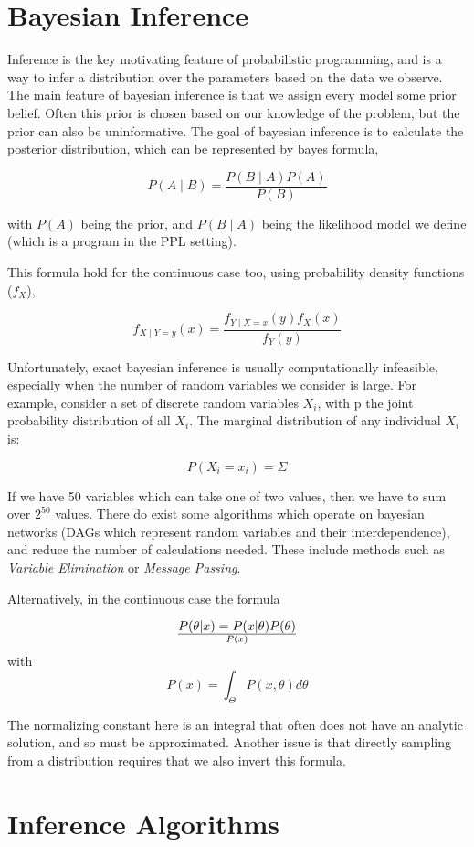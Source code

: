 \section{Bayesian Inference}
Inference is the key motivating feature of probabilistic programming, and is a way to infer a distribution over the parameters based on the data we observe. The main feature of bayesian inference is that we assign every model some prior belief. Often this prior is chosen based on our knowledge of the problem, but the prior can also be uninformative. The goal of bayesian inference is to calculate the posterior distribution, which can be represented by bayes formula,


$$P(A\mid B)={\frac {P(B\mid A)P(A)}{P(B)}}$$

with $P(A)$ being the prior, and $P(B\mid A)$ being the likelihood model we define (which is a program in the PPL setting).

This formula hold for the continuous case too, using probability density functions ($f_X$),

$$ f_{X\mid Y=y}(x)={\frac {f_{Y\mid X=x}(y)f_{X}(x)}{f_{Y}(y)}} $$

Unfortunately, exact bayesian inference is usually computationally infeasible, especially when the number of random variables we consider is large. For example, consider a set of discrete random variables ${X_i}$, with p the joint probability distribution of all $X_i$. The marginal distribution of any individual $X_i$ is:

$$P(X_i=x_i) = \Sigma_{} $$

If we have 50 variables which can take one of two values, then we have to sum over $2^{50}$ values. There do exist some algorithms which operate on bayesian networks (DAGs which represent random variables and their interdependence), and reduce the number of calculations needed. These include methods such as \textit{Variable Elimination} or \textit{Message Passing}.

Alternatively, in the continuous case the formula 

$$P(\theta|x)=P(x|\theta)P(\theta)\over{P(x)}$$
with 
$$ P(x)=\int_{\Theta}P(x,\theta)d\theta $$

The normalizing constant here is an integral that often does not have an analytic solution, and so must be approximated. Another issue is that directly sampling from a distribution requires that we also invert this formula.

\section{Inference Algorithms}

